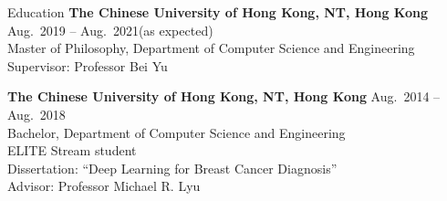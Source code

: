 

\begin{rSection}{Education}
{\bf The Chinese University of Hong Kong, NT, Hong Kong} \hfill {Aug.~2019 -- Aug.~2021(as expected)} \\ 
Master of Philosophy, Department of Computer Science and Engineering \\
Supervisor: Professor Bei Yu

{\bf The Chinese University of Hong Kong, NT, Hong Kong} \hfill {Aug.~2014 -- Aug.~2018} \\ 
Bachelor, Department of Computer Science and Engineering \\
ELITE Stream student \\
Dissertation: ``Deep Learning for Breast Cancer Diagnosis'' \\ 
Advisor: Professor Michael R. Lyu
\end{rSection}




